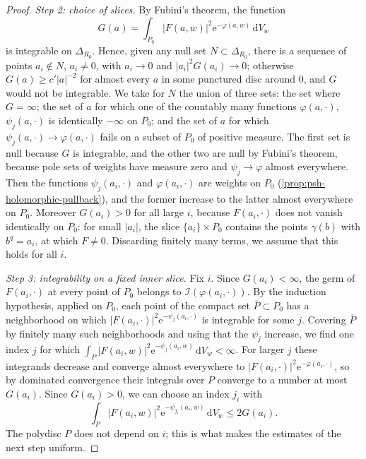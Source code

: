 \begin{proof}
\emph{Step 2: choice of slices.} By Fubini's theorem, the function
\[
 G(a)=\int_{P_0}|F(a,w)|^2\mathrm e^{-\varphi(a,w)}\,\mathrm dV_w
\]
is integrable on $\Delta_{R_0}$. Hence, given any null set $N\subset\Delta_{R_0}$, there is a sequence of points $a_i\notin N$, $a_i\neq0$, with $a_i\to0$ and $|a_i|^2G(a_i)\to0$; otherwise $G(a)\geq c'|a|^{-2}$ for almost every $a$ in some punctured disc around $0$, and $G$ would not be integrable. We take for $N$ the union of three sets: the set where $G=\infty$; the set of $a$ for which one of the countably many functions $\varphi(a,\cdot)$, $\psi_j(a,\cdot)$ is identically $-\infty$ on $P_0$; and the set of $a$ for which $\psi_j(a,\cdot)\to\varphi(a,\cdot)$ fails on a subset of $P_0$ of positive measure. The first set is null because $G$ is integrable, and the other two are null by Fubini's theorem, because pole sets of weights have measure zero and $\psi_j\to\varphi$ almost everywhere. Then the functions $\psi_j(a_i,\cdot)$ and $\varphi(a_i,\cdot)$ are weights on $P_0$ (\cref{prop:psh-holomorphic-pullback}), and the former increase to the latter almost everywhere on $P_0$. Moreover $G(a_i)>0$ for all large $i$, because $F(a_i,\cdot)$ does not vanish identically on $P_0$: for small $|a_i|$, the slice $\{a_i\}\times P_0$ contains the points $\gamma(b)$ with $b^q=a_i$, at which $F\neq0$. Discarding finitely many terms, we assume that this holds for all $i$.

\emph{Step 3: integrability on a fixed inner slice.} Fix $i$. Since $G(a_i)<\infty$, the germ of $F(a_i,\cdot)$ at every point of $P_0$ belongs to $\mathcal I(\varphi(a_i,\cdot))$. By the induction hypothesis, applied on $P_0$, each point of the compact set $\overline P\subset P_0$ has a neighborhood on which $|F(a_i,\cdot)|^2\mathrm e^{-\psi_j(a_i,\cdot)}$ is integrable for some $j$. Covering $\overline P$ by finitely many such neighborhoods and using that the $\psi_j$ increase, we find one index $j$ for which $\int_P|F(a_i,w)|^2\mathrm e^{-\psi_j(a_i,w)}\,\mathrm dV_w<\infty$. For larger $j$ these integrands decrease and converge almost everywhere to $|F(a_i,\cdot)|^2\mathrm e^{-\varphi(a_i,\cdot)}$, so by dominated convergence their integrals over $P$ converge to a number at most $G(a_i)$. Since $G(a_i)>0$, we can choose an index $j_i$ with
\[
 \int_P|F(a_i,w)|^2\mathrm e^{-\psi_{j_i}(a_i,w)}\,\mathrm dV_w
                          \leq2G(a_i).
\]
The polydisc $P$ does not depend on $i$; this is what makes the estimates of the next step uniform.


\end{proof}

